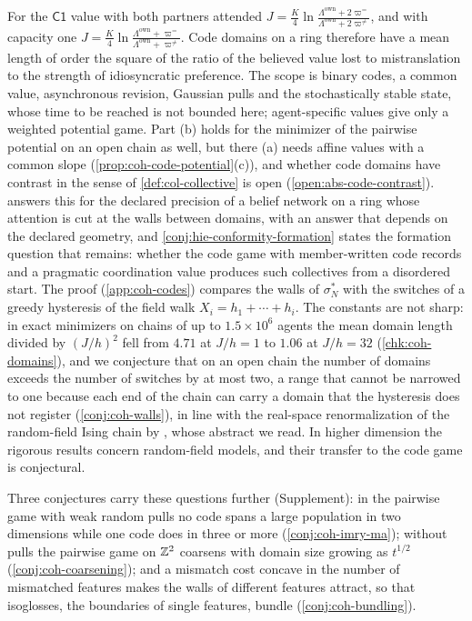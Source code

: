 For the $\mathsf{C1}$ value with both partners attended $J=\frac K4\ln\frac{\Lambda^{\mathrm{own}}+2\varpi^{=}}{\Lambda^{\mathrm{own}}+2\varpi^{\neq}}$, and with capacity one $J=\frac K4\ln\frac{\Lambda^{\mathrm{own}}+\varpi^{=}}{\Lambda^{\mathrm{own}}+\varpi^{\neq}}$. Code domains on a ring therefore have a mean length of order the square of the ratio of the believed value lost to mistranslation to the strength of idiosyncratic preference. The scope is binary codes, a common value, asynchronous revision, Gaussian pulls and the stochastically stable state, whose time to be reached is not bounded here; agent-specific values give only a weighted potential game. Part (b) holds for the minimizer of the pairwise potential on an open chain as well, but there (a) needs affine values with a common slope (\cref{prop:coh-code-potential}(c)), and whether code domains have contrast in the sense of \cref{def:col-collective} is open (\cref{open:abs-code-contrast}).  answers this for the declared precision of a belief network on a ring whose attention is cut at the walls between domains, with an answer that depends on the declared geometry, and \cref{conj:hie-conformity-formation} states the formation question that remains: whether the code game with member-written code records and a pragmatic coordination value produces such collectives from a disordered start. The proof (\cref{app:coh-codes}) compares the walls of $\sigma^\ast_N$ with the switches of a greedy hysteresis of the field walk $X_i=h_1+\cdots+h_i$. The constants are not sharp: in exact minimizers on chains of up to $1.5\times10^6$ agents the mean domain length divided by $(J/h)^2$ fell from $4.71$ at $J/h=1$ to $1.06$ at $J/h=32$ (\cref{chk:coh-domains}), and we conjecture that on an open chain the number of domains exceeds the number of switches by at most two, a range that cannot be narrowed to one because each end of the chain can carry a domain that the hysteresis does not register (\cref{conj:coh-walls}), in line with the real-space renormalization of the random-field Ising chain by \citet{fisher2001nonequilibrium}, whose abstract we read. In higher dimension the rigorous results concern random-field models, and their transfer to the code game is conjectural.

Three conjectures carry these questions further (Supplement): in the pairwise game with weak random pulls no code spans a large population in two dimensions while one code does in three or more (\cref{conj:coh-imry-ma}); without pulls the pairwise game on $\mathbb{Z}^2$ coarsens with domain size growing as $t^{1/2}$ (\cref{conj:coh-coarsening}); and a mismatch cost concave in the number of mismatched features makes the walls of different features attract, so that isoglosses, the boundaries of single features, bundle (\cref{conj:coh-bundling}).

